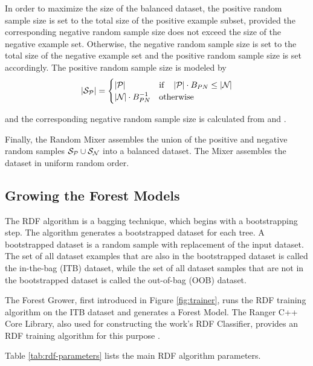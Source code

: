 In order to maximize the size of the balanced dataset, the positive random sample size is set to the total size of the positive example subset, provided the corresponding negative random sample size does not exceed the size of the negative example set. Otherwise, the negative random sample size is set to the total size of the negative example set and the positive random sample size is set accordingly. The positive random sample size is modeled by
%
\begin{equation}
  \label{eq:possubsetsize}
  |\mathcal{S}_{\mathcal{P}_{\mathbf{}}}| = \begin{cases}
    |\mathcal{P}_{\mathbf{}}| & \text{if\hspace{0.4cm}} |\mathcal{P}_{\mathbf{}}|\cdot B_{PN} \le |\mathcal{N}_{\mathbf{}}| \\
    |\mathcal{N}_{\mathbf{}}|\cdot B_{PN}^{-1} & \text{otherwise}
  \end{cases}
\end{equation}


and the corresponding negative random sample size is calculated from  and .

\def\BDS{\mat{BDS}}
Finally, the Random Mixer assembles the union of the positive and negative random samples $\mathcal{S}_{\mathcal{P}_{\mathbf{}}}\cup\mathcal{S}_{\mathcal{N}_{\mathbf{}}}$ into a balanced dataset. The Mixer assembles the dataset in uniform random order.

\subsection{Growing the Forest Models}

The RDF algorithm is a bagging technique, which begins with a bootstrapping step. The algorithm generates a bootstrapped dataset for each tree. A bootstrapped dataset is a random sample with replacement of the input dataset. The set of all dataset examples that are also in the bootstrapped dataset is called the in-the-bag (ITB) dataset, while the set of all dataset samples that are not in the bootstrapped dataset is called the out-of-bag (OOB) dataset. 


The Forest Grower, first introduced in Figure \ref{fig:trainer}, runs the RDF training algorithm on the ITB dataset and generates a Forest Model. The Ranger C++ Core Library, also used for constructing the work's RDF Classifier, provides an RDF training algorithm for this purpose \cite{Wright2017}.


Table \ref{tab:rdf-parameters} lists the main RDF algorithm parameters.

